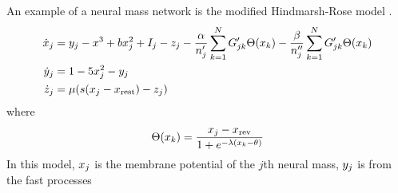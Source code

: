 An example of a neural mass network is the modified Hindmarsh-Rose model \cite{Santos2017}.
\begin{align}
  \label{eq:hr_x}
  \dot{\hrx}_{j}
  &=
    \hry_{j}
    -
    \hrx^{3}
    +
    b \hrx_{j}^{2}
    +
    I_{j}
    -
    \hrz_{j}
    -
    \frac{\hra}{n'_{j}} \sum_{k = 1}^{N} G'_{j k} \Theta(\hrx_{k})
    -
    \frac{\hrb}{n''_{j}} \sum_{k = 1}^{N} G'_{j k} \Theta(\hrx_{k}) \\
  \label{eq:hr_y}
  \dot{\hry}_{j}
  &=
    1
    -
    5 \hrx_{j}^{2}
    -
    \hry_{j} \\
  \label{eq:hr_z}
  \dot{\hrz}_{j}
  &=
    \mu \pqty{s \pqty{\hrx_{j} - \hrx_{\text{rest}}} - \hrz_{j}}
\end{align}
where
\begin{equation}
  \label{eq:hr_sigmoid}
  \Theta(\hrx_{k})
  =
  \frac{\hrx_{j} - \hrx_{\text{rev}}}{1 + e^{-\lambda \pqty{\hrx_{k} - \theta}}}
\end{equation}
In this model, $x_{j}$ is the membrane potential of the $j$th neural mass, $y_{j}$ is from the fast processes

